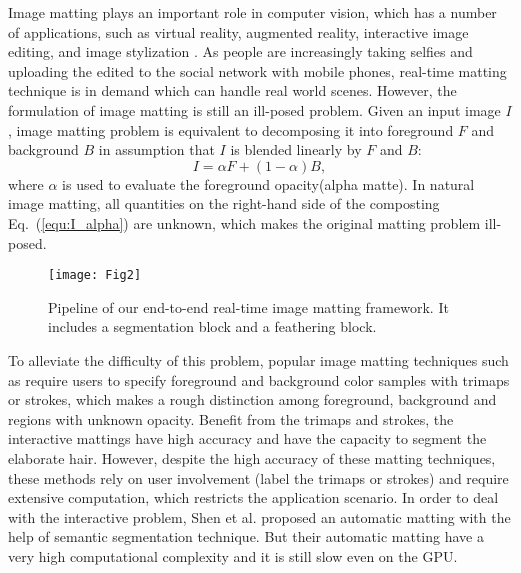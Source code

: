 \documentclass[sigconf]{acmart}
\begin{document}
Image matting plays an important role in computer vision, which has a number of applications, such as virtual reality, augmented reality, interactive image editing, and image stylization \cite{shen2016automatic}. As people are increasingly taking selfies and uploading the edited to the social network with mobile phones, real-time matting technique is in demand which can handle real world scenes. However, the formulation of image matting is still an ill-posed problem. Given an input image $I$, image matting problem is equivalent to decomposing it into foreground $F$ and background $B$ in assumption that $I$ is blended linearly by $F$ and $B$:
\begin{equation}
  I = \alpha F + (1 - \alpha )B,
  \label{equ:I_alpha}
\end{equation}
where $\alpha$ is used to evaluate the foreground opacity(alpha matte). In natural image matting, all quantities on the right-hand side of the composting Eq.~(\ref{equ:I_alpha}) are unknown, which makes the original matting problem ill-posed.

\begin{figure*}
\texttt{[image: Fig2]}
\caption{Pipeline of our end-to-end real-time image matting framework. It includes a segmentation block and a feathering block.}
\label{tab:overallpipeline}
\end{figure*}

To alleviate the difficulty of this problem, popular image matting techniques such as \cite{levin2008closed,he2010fast,gastal2010shared,shen2016deep} require users to specify foreground and background color samples with trimaps or strokes, which makes a rough distinction among foreground, background and regions with unknown opacity. Benefit from the trimaps and strokes, the interactive mattings have high accuracy and have the capacity to segment the elaborate hair. However, despite the high accuracy of these matting techniques, these methods rely on user involvement (label the trimaps or strokes) and require extensive computation, which restricts the application scenario. In order to deal with the interactive problem, Shen et al. \cite{shen2016deep} proposed an automatic matting with the help of semantic segmentation technique. But their automatic matting have a very high  computational complexity and it  is still slow even on the GPU.
\end{document}
